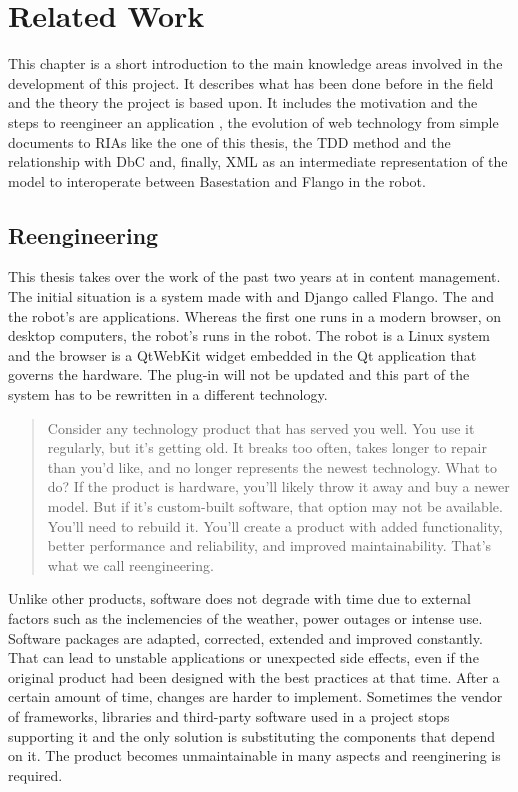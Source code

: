 \chapter{Related Work}
This chapter is a short introduction to the main knowledge areas involved in the development of this project.
It describes what has been done before in the field and the theory the project is based upon.
It includes the motivation and the steps to reengineer an application , the evolution of web technology from simple documents to \acp{RIA} like the one of this thesis, the \ac{TDD} method and the relationship with \ac{DbC} and, finally, \ac{XML} as an intermediate representation of the model to interoperate between Basestation and Flango \cm in the robot.

\section{Reengineering}
\label{sec:reengineering}
This thesis takes over the work of the past two years at \company in content management.
The initial situation is a system made with \flash and Django called Flango.
The \se and the robot's \cm are \flash applications.
Whereas the first one runs in a modern browser, on desktop computers, the robot's \cm runs in the robot.
The robot is a Linux system and the browser is a QtWebKit widget embedded in the Qt application that governs the hardware.
The \flash plug-in will not be updated and this part of the system has to be rewritten in a different technology.

\begin{quote} 
Consider any technology product that has served you well. 
You use it regularly, but it's getting old. 
It breaks too often, takes longer to repair than you'd like, and no longer represents the newest technology.
What to do? If the product is hardware, you'll likely throw it away and buy a newer model.
But if it's custom-built software, that option may not be available. 
You'll need to rebuild it. 
You'll create a product with added functionality, better performance and reliability, and improved maintainability.
That's what we call reengineering. \cite{Pressman:2007}
\end{quote}
Unlike other products, software does not degrade with time due to external factors such as the inclemencies of the weather, power outages or intense use.
Software packages are adapted, corrected, extended and improved constantly.
That can lead to unstable applications or unexpected side effects, even if the original product had been designed with the best practices at that time.
After a certain amount of time, changes are harder to implement. %
Sometimes the vendor of frameworks, libraries and third-party software used in a project stops supporting it and the only solution is substituting the components that depend on it. 
The product becomes unmaintainable in many aspects and reenginering is required. 

